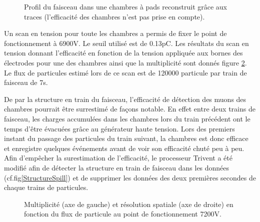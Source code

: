\begin{figure}[ht!]
	\hfill
	\caption{Profil du faisceau dans une chambres à pads reconstruit grâce aux traces (l’efficacité des chambres n’est pas prise en compte).}
	\label{ProfilFaisceauSPS}
\end{figure}

Un scan en tension pour toute les chambres a permis de fixer le point de fonctionnement à 6900V. Le seuil utilisé est de 0.13pC. Les résultats du scan en tension donnant l’efficacité en fonction de la tension appliquée aux bornes des électrodes pour une des chambres ainsi que la multiplicité sont donnés figure \ref{HVSPS}. Le flux de particules estimé lors de ce scan est de 120000 particule par train de faisceau de 7s.

De par la structure en train du faisceau, l'efficacité de détection des muons des chambres pourrait être surrestimé de façons notable. En effet entre deux trains de faisceau, les charges accumulées dans les chambres lors du train précédent ont le temps d'être évacuées grâce au générateur haute tension. Lors des premiers instant du passage des particules du train suivant, la chambres est donc efficace et enregistre quelques événements avant de voir son efficacité chuté peu à peu. Afin d'empêcher la surestimation de l'efficacité, le processeur Trivent a été modifié afin de détecter la structure en train de faisceau dans les données (cf.fig\ref{StructureSpill}) et de supprimer les données des deux premières secondes de chaque trains de particules.


\begin{figure}[!ht]
	\centering
	\scalebox{1.4}{}
	\caption{Multiplicité (axe de gauche) et résolution spatiale (axe de droite) en fonction du flux de particule au point de fonctionnement 7200V.}
	\label{HVSPS}
\end{figure}
